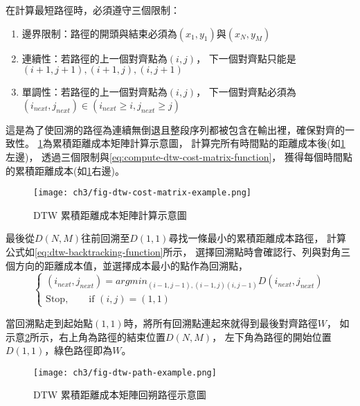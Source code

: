 \documentclass[class=NCU_thesis, crop=false]{standalone}
\begin{document}
在計算最短路徑時，必須遵守三個限制：
\begin{enumerate}
    \item 邊界限制：路徑的開頭與結束必須為$(x_1,y_1)$與$(x_N,y_M)$
    \item 連續性：若路徑的上一個對齊點為$(i, j)$， 
    下一個對齊點只能是$(i+1, j+1), (i+1, j), (i, j+1)$
    \item 單調性：若路徑的上一個對齊點為$(i, j)$，
    下一個對齊點必須為$(i_{next}, j_{next}) \in (i_{next} \geq i, j_{next} \geq j)$
\end{enumerate}

這是為了使回溯的路徑為連續無倒退且整段序列都被包含在輸出裡，確保對齊的一致性。
\cref{fig:fig-ch3-dtw-cost-matrix-example}為累積距離成本矩陣計算示意圖，
計算完所有時間點的距離成本後(如\cref{fig:fig-ch3-dtw-cost-matrix-example}左邊)，
透過三個限制與\cref{eq:compute-dtw-cost-matrix-function}，
獲得每個時間點的累積距離成本(如\cref{fig:fig-ch3-dtw-cost-matrix-example}右邊)。

\begin{figure}[H]
    \centering
    \texttt{[image: ch3/fig-dtw-cost-matrix-example.png]}
    \caption{DTW 累積距離成本矩陣計算示意圖}
    \label{fig:fig-ch3-dtw-cost-matrix-example}
\end{figure}

最後從$D(N, M)$往前回溯至$D(1, 1)$尋找一條最小的累積距離成本路徑，
計算公式如\cref{eq:dtw-backtracking-function}所示，
選擇回溯點時會確認行、列與對角三個方向的距離成本值，並選擇成本最小的點作為回溯點，
\begin{equation} 
    \label{eq:dtw-backtracking-function}
    \begin{cases}
        \text{$(i_{next}, j_{next}) = argmin_{(i-1,j-1),(i-1,j)(i,j-1)}D(i_{next}, j_{next})$} \\
        \text{Stop},\qquad \text{if $(i, j) = (1, 1)$} 
    \end{cases}
\end{equation}

當回溯點走到起始點$(1, 1)$時，將所有回溯點連起來就得到最後對齊路徑$W$，
如示意\cref{fig:fig-ch3-dtw-path-example}所示，右上角為路徑的結束位置$D(N, M)$，
左下角為路徑的開始位置$D(1, 1)$，綠色路徑即為$W$。
\begin{figure}[!hbt]
    \centering
    \texttt{[image: ch3/fig-dtw-path-example.png]}
    \caption{DTW 累積距離成本矩陣回朔路徑示意圖}
    \label{fig:fig-ch3-dtw-path-example}
\end{figure}
\end{document}
